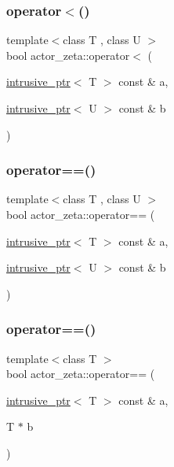 \subsubsection{\texorpdfstring{operator$<$()}{operator<()}}
{\footnotesize\ttfamily template$<$class T , class U $>$ \\
bool actor\+\_\+zeta\+::operator$<$ (\begin{DoxyParamCaption}\item[{\hyperlink{classactor__zeta_1_1intrusive__ptr}{intrusive\+\_\+ptr}$<$ T $>$ const \&}]{a,  }\item[{\hyperlink{classactor__zeta_1_1intrusive__ptr}{intrusive\+\_\+ptr}$<$ U $>$ const \&}]{b }\end{DoxyParamCaption})\hspace{0.3cm}{\ttfamily [noexcept]}}

\mbox{\label{namespaceactor__zeta_ac598ab23cb84372ba91500b5d4747ee0}} 
\subsubsection{\texorpdfstring{operator==()}{operator==()}\hspace{0.1cm}{\footnotesize\ttfamily [1/3]}}
{\footnotesize\ttfamily template$<$class T , class U $>$ \\
bool actor\+\_\+zeta\+::operator== (\begin{DoxyParamCaption}\item[{\hyperlink{classactor__zeta_1_1intrusive__ptr}{intrusive\+\_\+ptr}$<$ T $>$ const \&}]{a,  }\item[{\hyperlink{classactor__zeta_1_1intrusive__ptr}{intrusive\+\_\+ptr}$<$ U $>$ const \&}]{b }\end{DoxyParamCaption})\hspace{0.3cm}{\ttfamily [noexcept]}}

\mbox{\label{namespaceactor__zeta_aab7f2c9b316e469055c2b954f2f19114}} 
\subsubsection{\texorpdfstring{operator==()}{operator==()}\hspace{0.1cm}{\footnotesize\ttfamily [2/3]}}
{\footnotesize\ttfamily template$<$class T $>$ \\
bool actor\+\_\+zeta\+::operator== (\begin{DoxyParamCaption}\item[{\hyperlink{classactor__zeta_1_1intrusive__ptr}{intrusive\+\_\+ptr}$<$ T $>$ const \&}]{a,  }\item[{T $\ast$}]{b }\end{DoxyParamCaption})\hspace{0.3cm}{\ttfamily [noexcept]}}

